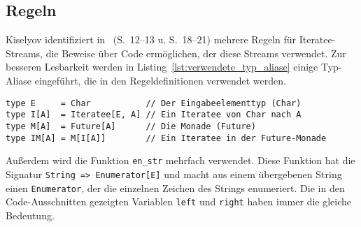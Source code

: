 


\subsection{Regeln} %
\label{sub:regeln}

Kiselyov identifiziert in \citealt{kiselyov2012}~(S.~12--13 u. S.~18--21) mehrere Regeln für Iteratee-Streams, die Beweise über Code ermöglichen, der diese Streams verwendet.
Zur besseren Lesbarkeit werden in Listing~\ref{lst:verwendete_typ_aliase} einige Typ-Aliase eingeführt, die in den Regeldefinitionen verwendet werden.

\begin{lstlisting}[caption=Typ-Aliase der Regeln, label=lst:verwendete_typ_aliase]
type E     = Char           // Der Eingabeelementtyp (Char)
type I[A]  = Iteratee[E, A] // Ein Iteratee von Char nach A
type M[A]  = Future[A]      // Die Monade (Future)
type IM[A] = M[I[A]]        // Ein Iteratee in der Future-Monade
\end{lstlisting}

Außerdem wird die Funktion \lstinline|en_str| mehrfach verwendet.
Diese Funktion hat die Signatur \lstinline|String => Enumerator[E]| und macht aus einem übergebenen String einen \lstinline|Enumerator|, der die einzelnen Zeichen des Strings enumeriert.
Die in den Code-Ausschnitten gezeigten Variablen \lstinline|left| und \lstinline|right| haben immer die gleiche Bedeutung.

